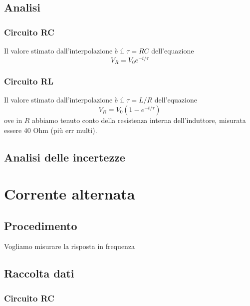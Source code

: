 \subsection{Analisi}

\subsubsection{Circuito RC}

Il valore stimato dall'interpolazione è il $\tau=RC$ dell'equazione
$$V_R = V_0 e^{-t/\tau}$$

\subsubsection{Circuito RL}

Il valore stimato dall'interpolazione è il $\tau=L/R$ dell'equazione
$$V_R = V_0 (1-e^{-t/\tau})$$
ove in $R$ abbiamo tenuto conto della resistenza interna dell'induttore, misurata essere 40 Ohm (più err multi).


\subsection{Analisi delle incertezze}


\section{Corrente alternata}
\subsection{Procedimento}

Vogliamo misurare la risposta in frequenza 

\subsection{Raccolta dati}

\subsubsection{Circuito RC}

